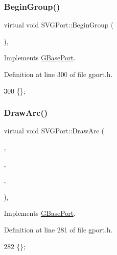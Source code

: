 \subsubsection{\texorpdfstring{Begin\+Group()}{BeginGroup()}}
{\footnotesize\ttfamily virtual void S\+V\+G\+Port\+::\+Begin\+Group (\begin{DoxyParamCaption}{ }\end{DoxyParamCaption})\hspace{0.3cm}{\ttfamily [inline]}, {\ttfamily [virtual]}}



Implements \mbox{\hyperlink{class_g_base_port_ac7aafbb728fe8b61dec2c3f163e2c894}{G\+Base\+Port}}.



Definition at line 300 of file gport.\+h.


\begin{DoxyCode}
300 \{\};
\end{DoxyCode}
\mbox{\label{class_s_v_g_port_aa849012cbcbb27a9db820cee968093c9}} 
\subsubsection{\texorpdfstring{Draw\+Arc()}{DrawArc()}}
{\footnotesize\ttfamily virtual void S\+V\+G\+Port\+::\+Draw\+Arc (\begin{DoxyParamCaption}\item[{const \mbox{\hyperlink{class_g_point}{G\+Point}} \&}]{,  }\item[{const int}]{,  }\item[{const double}]{,  }\item[{const double}]{ }\end{DoxyParamCaption})\hspace{0.3cm}{\ttfamily [inline]}, {\ttfamily [virtual]}}



Implements \mbox{\hyperlink{class_g_base_port_af9375a9f4cd1bc94ac70eb71c437835a}{G\+Base\+Port}}.



Definition at line 281 of file gport.\+h.


\begin{DoxyCode}
282                                         \{\};
\end{DoxyCode}
\mbox{\label{class_s_v_g_port_a9aba350c03b01d93168882746b18ec07}} 
